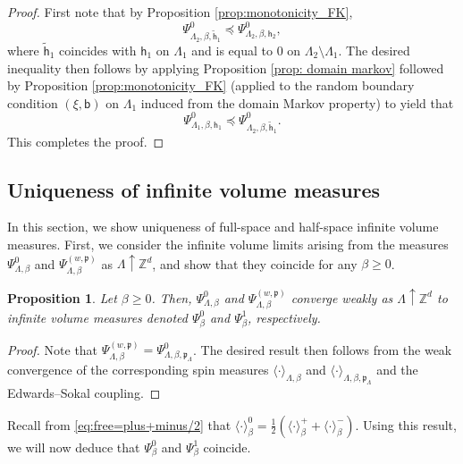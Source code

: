 \documentclass[11pt,a4paper]{article}
\newtheorem{proposition}[theorem]{Proposition}
\theoremstyle{definition}
\numberwithin{equation}{section}
\begin{document}
\begin{proof}
First note that by Proposition \ref{prop:monotonicity_FK},
\begin{equation}
\Psi_{\Lambda_2,\beta,\tilde {\mathsf h}_1}^{0}\preccurlyeq \Psi_{\Lambda_2,\beta,\mathsf{h}_2}^{0},   
\end{equation}
where $\tilde {\mathsf h}_1$ coincides with $\mathsf h_1$ on $\Lambda_1$ and is equal to $0$ on $\Lambda_2\setminus \Lambda_1$.
The desired inequality then follows by applying Proposition \ref{prop: domain markov} followed by Proposition \ref{prop:monotonicity_FK} (applied to the random boundary condition $(\xi,\mathsf{b})$ on $\Lambda_1$ induced from the domain Markov property) to yield that
\begin{equation}
\Psi_{\Lambda_1,\beta,\mathsf{h}_1}^{0}\preccurlyeq \Psi_{\Lambda_2,\beta,\tilde{\mathsf h}_1}^{0}.  
\end{equation}
This completes the proof.
\end{proof}


\subsection{Uniqueness of infinite volume measures}

In this section, we show uniqueness of full-space and half-space infinite volume measures. First, we consider the infinite volume limits arising from the measures $\Psi^0_{\Lambda,\beta}$ and $\Psi^{(w,\mathfrak{p})}_{\Lambda,\beta}$ as $\Lambda \uparrow \mathbb{Z}^d$, and show that they coincide for any $\beta\geq 0$. 

\begin{proposition}
Let $\beta\geq 0$. Then, $\Psi^0_{\Lambda,\beta}$ and $\Psi^{(w,\mathfrak{p})}_{\Lambda,\beta}$ converge weakly as $\Lambda \uparrow \mathbb{Z}^d$ to infinite volume measures denoted $\Psi^0_{\beta}$ and $\Psi^1_{\beta}$, respectively.
\end{proposition}

\begin{proof}
Note that $\Psi^{(w,\mathfrak{p})}_{\Lambda,\beta}=\Psi^0_{\Lambda,\beta,\mathfrak{p}_{\Lambda}}$. The desired result then follows from the weak convergence of the corresponding spin measures $\langle \cdot \rangle_{\Lambda,\beta}$ and $\langle \cdot \rangle_{\Lambda,\beta,\mathfrak{p}_{\Lambda}}$ and the Edwards--Sokal coupling.    
\end{proof}

Recall from \eqref{eq:free=plus+minus/2} that $\langle \cdot\rangle_\beta^0=\tfrac{1}{2}(\langle \cdot \rangle^+_{\beta}+\langle \cdot \rangle^-_{\beta})$. Using this result, we will now deduce that $\Psi^0_{\beta}$ and $\Psi^1_{\beta}$ coincide.
\end{document}
